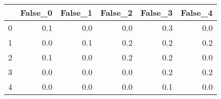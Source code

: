 \begin{tabular}{lrrrrr}
\toprule
{} &  False\_0 &  False\_1 &  False\_2 &  False\_3 &  False\_4 \\ \hline
\midrule
0 &      0.1 &      0.0 &      0.0 &      0.3 &      0.0 \\ \hline
1 &      0.0 &      0.1 &      0.2 &      0.2 &      0.2 \\ \hline
2 &      0.1 &      0.0 &      0.2 &      0.2 &      0.0 \\ \hline
3 &      0.0 &      0.0 &      0.0 &      0.2 &      0.2 \\ \hline
4 &      0.0 &      0.0 &      0.0 &      0.1 &      0.0 \\ \hline
\bottomrule
\end{tabular}
